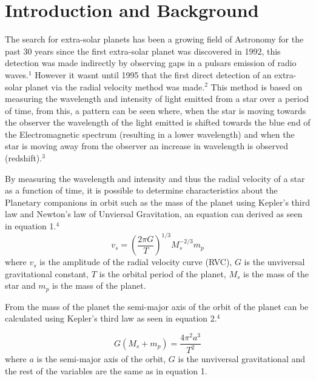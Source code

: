 \documentclass[]{article}
\begin{document}
\section*{Introduction and Background}
The search for extra-solar planets has been a growing field of Astronomy for the 
past 30 years since the first extra-solar planet was discovered in 1992, this 
detection was made indirectly by observing gaps in a pulsars emission of radio waves.$^1 $
However it wasnt until 1995 that the first direct detection of an extra-solar planet 
via the radial velocity method was made.$^2$ This method is based on measuring the 
wavelength and intensity of light emitted from a star over a period of time, 
from this, a pattern can be seen where, when the star is moving towards the observer
the wavelength of the light emitted is shifted towards the blue end of the 
Electromagnetic spectrum 
(resulting in a lower wavelength) and when the star is moving away from the observer
an increase in wavelength is observed (redshift).$^3$
\par
By measuring the wavelength and intensity and thus the radial velocity of a star as 
a function of time, it is possible to determine characteristics about the Planetary
companions in orbit such as the mass of the planet using Kepler's third law and Newton's
law of Unviersal Gravitation, an equation can derived as seen in equation 1.$^4$
\begin{equation}\label{eq:mass of planet eq}
  v_s = \left(\frac{2\pi G}{T}\right)^{1/3}M_s^{-2/3}m_p
\end{equation}
where $v_s$ is the amplitude of the radial velocity curve (RVC), $G$ is the unviversal
gravitational constant, $T$ is the orbital period of the planet, $M_s$ is the mass of
the star and $m_p$ is the mass of the planet.
\par
From the mass of the planet the semi-major axis of the orbit of the planet can be 
calculated using Kepler's third law as seen in equation 2.$^4$

\begin{equation}\label{eq:semi-major axis eq}
  G(M_s+m_p) = \frac{4\pi^2a^3}{T^2}
\end{equation}
where $a$ is the semi-major axis of the orbit, $G$ is the unviversal gravitational
and the rest of the variables are the same as in equation 1.
\par
\end{document}
